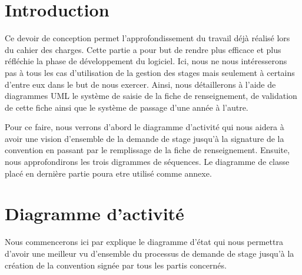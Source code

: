 \documentclass{scrreprt}
\begin{document}
\tableofcontents

\chapter{Introduction}

Ce devoir de conception permet l'approfondissement du travail déjà réalisé lors du 
cahier des charges. Cette partie a pour but de rendre plus efficace et plus réfléchie la phase 
de développement du logiciel. Ici, nous ne nous intéresserons pas à tous les cas d'utilisation 
de la gestion des stages mais seulement à certains d'entre eux dans le but de nous exercer. Ainsi, 
nous détaillerons à l'aide de diagrammes UML le système de saisie de la fiche de renseignement, de  
validation de cette fiche ainsi que le système de passage d'une année à l'autre.  

	Pour ce faire, nous verrons d'abord le diagramme d'activité qui nous aidera à avoir une vision 
d'ensemble de la demande de stage jusqu'à la signature de la convention en passant par le remplissage
de la fiche de renseignement. Ensuite, nous approfondirons les trois digrammes de séquences. Le diagramme
de classe placé en dernière partie poura etre utilisé comme annexe. 

\newpage
\chapter{Diagramme d'activité}

	Nous commencerons ici par explique le diagramme d'état qui nous permettra d'avoir une meilleur vu d'ensemble
du processus de demande de stage jusqu'à la création de la convention signée par tous les partis concernés. 
\end{document}
